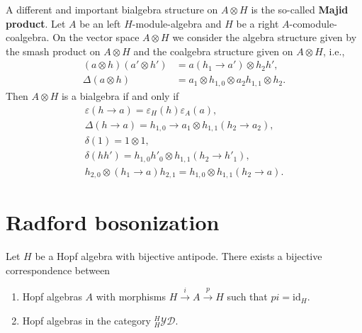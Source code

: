\begin{remark}
A different and important bialgebra structure on $A\otimes H$ is
the so-called \textbf{Majid product}. Let $A$ be an left $H$-module-algebra
and $H$ be a right $A$-comodule-coalgebra. On the vector space $A\otimes H$
we consider the algebra structure given by the smash product on $A\otimes H$ and the coalgebra
structure given on $A\otimes H$, i.e.,
\begin{align*}
(a\otimes h)(a'\otimes h') & =a(h_{1}\rightarrow a')\otimes h_{2}h',\\
\Delta(a\otimes h) & =a_{1}\otimes h_{1,0}\otimes a_{2}h_{1,1}\otimes h_{2}.\end{align*}
Then $A\otimes H$ is a bialgebra if and only if \begin{gather*}
\varepsilon(h\rightarrow a)=\varepsilon_{H}(h)\varepsilon_{A}(a),\\
\Delta(h\rightarrow a)=h_{1,0}\rightarrow a_{1}\otimes h_{1,1}(h_{2}\rightarrow a_{2}),\\
\delta(1)=1\otimes1,\\
\delta(hh')=h_{1,0}h'_{0}\otimes h_{1,1}(h_{2}\rightarrow h'_{1}),\\
h_{2,0}\otimes(h_{1}\rightarrow a)h_{2,1}=h_{1,0}\otimes h_{1,1}(h_{2}\rightarrow a).
\end{gather*}
\end{remark}

\section{Radford bosonization}

\begin{theorem}
\label{theorem:bosonization}
Let $H$ be a Hopf algebra with bijective antipode. There exists a bijective
correspondence between
\begin{enumerate}
\item Hopf algebras $A$ with morphisms $H\xrightarrow{i}A\xrightarrow{p}H$
such that $pi=\textrm{id}_{H}$.
\item Hopf algebras in the category $_{H}^{H}\mathcal{YD}$.
\end{enumerate}
\end{theorem}

